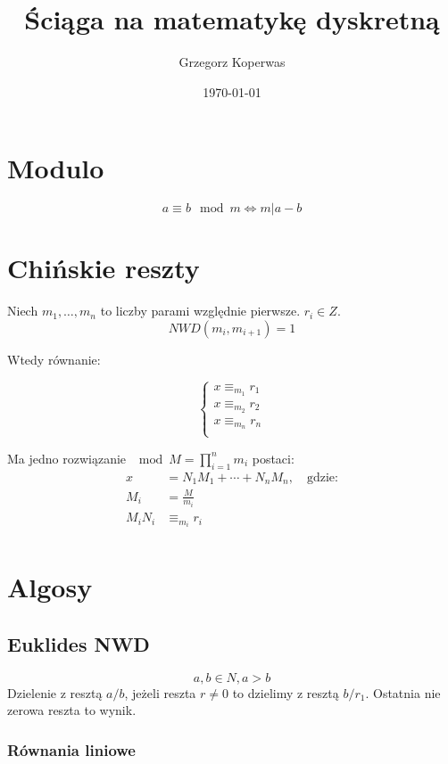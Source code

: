 \documentclass[a4paper,12pt]{article}
\title{Ściąga na matematykę dyskretną}
\author{Grzegorz Koperwas}
\date{\today}
\begin{document}
\begin{multicols}{2}
    
    \section{Modulo}

    \[
        a \equiv b \mod m \Leftrightarrow m | a - b
    \]

    \section{Chińskie reszty}

    Niech $m_1, \dots, m_n$ to liczby parami względnie pierwsze. $r_i \in Z$.
    \[
        NWD\left(m_i, m_{i+1}\right) = 1
    \]
    
    Wtedy równanie:

    \begin{equation*}
        \left\{ 
        \begin{matrix}
            x \equiv_{m_1} r_1 \\
            x \equiv_{m_2} r_2 \\ 
            x \equiv_{m_n} r_n \\ 
        \end{matrix}
        \right.
    \end{equation*}

    Ma jedno rozwiązanie $\mod M = {\prod_{i=1}^{n} m_i}$ postaci:
    \begin{align*}
        x &= N_1 M_1 + \cdots + N_n M_n,\quad \text{gdzie:} \\
        M_i &= \frac{M}{m_i} \\
        M_i N_i &\equiv_{m_i} r_i \\
    \end{align*}




    \section{Algosy}

    \subsection{Euklides NWD}
    \[
        a, b \in N, a > b 
    \]
    Dzielenie z resztą $a / b$, jeżeli reszta $r \not= 0$ to dzielimy z resztą $b /
    r_1$. Ostatnia nie zerowa reszta to wynik.

    \subsubsection{Równania liniowe}


\end{multicols}
\end{document}
